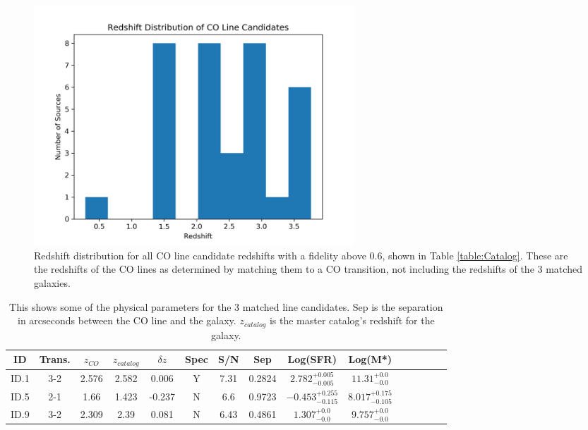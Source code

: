 \begin{figure}[tbp]
\centering \includegraphics[width=120mm]{Survey/redshift_catalog.png}
\caption{Redshift distribution for all CO line candidate redshifts with a fidelity above 0.6, shown in Table \ref{table:Catalog}. These are the redshifts of the CO lines as determined by matching them to a CO transition, not including the redshifts of the 3 matched galaxies.}
\label{fig:cat_red}
\end{figure}

\begin{table}
\caption{This shows some of the physical parameters for the 3 matched line candidates. Sep is the separation in arcseconds between the CO line and the galaxy. $z_{catalog}$ is the master catalog's redshift for the galaxy.}
\begin{tabular}{ccccccccccccccc}
ID & Trans. & $z_{CO}$ & $z_{catalog}$ & $\delta z$ & Spec & S/N & Sep & Log(SFR) & Log(M*) \\
\hline
ID.1 & 3-2 & 2.576 & 2.582 & 0.006 & Y & 7.31 & 0.2824 & $2.782_{-0.005}^{+0.005}$ & $11.31_{-0.0}^{+0.0}$  \\
ID.5 & 2-1 & 1.66 & 1.423 & -0.237 & N & 6.6 & 0.9723 & $-0.453_{-0.115}^{+0.255}$ & $8.017_{-0.105}^{+0.175}$ \\
ID.9 & 3-2 & 2.309 & 2.39 & 0.081 & N & 6.43 & 0.4861 & $1.307_{-0.0}^{+0.0}$ & $9.757_{-0.0}^{+0.0}$ \\
\end{tabular}\label{table:matched_gal}
\end{table}

